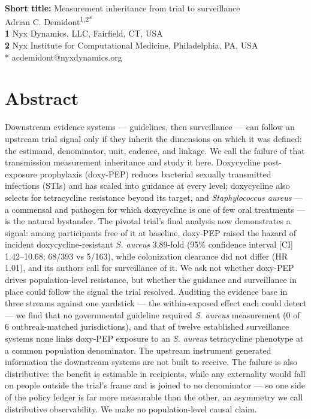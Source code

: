 \documentclass[10pt,letterpaper]{article}
\begin{document}
\vspace*{0.2in}

\begin{flushleft}
{\Large
\textbf{}
}
\newline
\\
\textbf{Short title:} Measurement inheritance from trial to surveillance
\\
Adrian C. Demidont\textsuperscript{1,2*}
\\
\bigskip
\textbf{1} Nyx Dynamics, LLC, Fairfield, CT, USA
\\
\textbf{2} Nyx Institute for Computational Medicine, Philadelphia, PA, USA
\\
\bigskip
* acdemidont@nyxdynamics.org

\end{flushleft}

\section*{Abstract}
Downstream evidence systems --- guidelines, then surveillance --- can follow an upstream trial
signal only if they inherit the dimensions on which it was defined: the estimand, denominator,
unit, cadence, and linkage. We call the failure of that transmission measurement
inheritance and study it here. Doxycycline post-exposure prophylaxis (doxy-PEP) reduces bacterial sexually transmitted infections (STIs) and has scaled into guidance at every level; doxycycline also selects for tetracycline
resistance beyond its target, and \emph{Staphylococcus aureus} --- a commensal and pathogen for
which doxycycline is one of few oral treatments --- is the natural bystander. The pivotal
trial's final analysis now demonstrates a signal: among participants free of it at baseline,
doxy-PEP raised the hazard of incident doxycycline-resistant \emph{S. aureus} 3.89-fold
(95\% confidence interval [CI] 1.42--10.68; 68/393 vs 5/163), while colonization clearance did not differ (HR 1.01), and
its authors call for surveillance of it. We ask not whether doxy-PEP drives population-level
resistance, but whether the guidance and surveillance in place could follow the signal the
trial resolved. Auditing the evidence base in three streams against one yardstick --- the
within-exposed effect each could detect --- we find that no governmental guideline required \emph{S. aureus} measurement (0 of 6 outbreak-matched jurisdictions), and that of twelve established surveillance systems
none links doxy-PEP exposure to an \emph{S. aureus} tetracycline phenotype at a common population
denominator. The upstream instrument generated information the downstream systems are not built to
receive. The failure is also distributive: the benefit is estimable in recipients, while any
externality would fall on people outside the trial's frame and is joined to no denominator --- so one
side of the policy ledger is far more measurable than the other, an asymmetry we call distributive
observability. We make no population-level causal claim.
\end{document}
